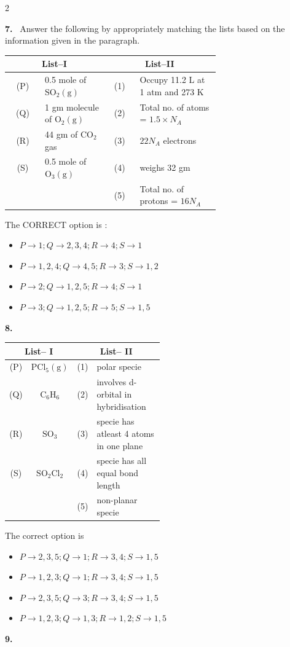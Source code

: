 \documentclass[10pt]{extarticle}
\newcommand{\qn}[1]{\par\smallskip\noindent\textbf{#1.}~}
\newenvironment{qoptions}{\begin{itemize}[leftmargin=1.8em,itemsep=1pt,topsep=2pt,label={}]}{\end{itemize}}
\newcommand{\opt}[2]{\item[(#1)] #2}
\begin{document}
\begin{multicols}{2}
\qn{7} Answer the following by appropriately matching the lists based on the information given in the paragraph.\par
{\small\setlength{\tabcolsep}{2pt}\begin{tabular}{|c|p{0.3\linewidth}|c|p{0.38\linewidth}|}
\hline
\multicolumn{2}{|c|}{\textbf{List--I}} & \multicolumn{2}{c|}{\textbf{List--II}}\\ \hline
(P) & 0.5 mole of $\mathrm{SO_2(g)}$ & (1) & Occupy 11.2 L at 1 atm and 273 K\\ \hline
(Q) & 1 gm molecule of $\mathrm{O_2(g)}$ & (2) & Total no. of atoms = $1.5\times N_A$\\ \hline
(R) & 44 gm of $\mathrm{CO_2}$ gas & (3) & $22N_A$ electrons\\ \hline
(S) & 0.5 mole of $\mathrm{O_3(g)}$ & (4) & weighs 32 gm\\ \hline
 & & (5) & Total no. of protons = $16N_A$\\ \hline
\end{tabular}}\par
The CORRECT option is :
\begin{qoptions}
\opt{A}{$P\to1;Q\to2,3,4;R\to4;S\to1$}
\opt{B}{$P\to1,2,4;Q\to4,5;R\to3;S\to1,2$}
\opt{C}{$P\to2;Q\to1,2,5;R\to4;S\to1$}
\opt{D}{$P\to3;Q\to1,2,5;R\to5;S\to1,5$}
\end{qoptions}
\qn{8}
{\small\setlength{\tabcolsep}{2pt}\begin{tabular}{|c|c|c|p{0.5\linewidth}|}
\hline
\multicolumn{2}{|c|}{\textbf{List-- I}} & \multicolumn{2}{c|}{\textbf{List-- II}}\\ \hline
(P) & $\mathrm{PCl_5(g)}$ & (1) & polar specie\\ \hline
(Q) & $\mathrm{C_6H_6}$ & (2) & involves d-orbital in hybridisation\\ \hline
(R) & $\mathrm{SO_3}$ & (3) & specie has atleast 4 atoms in one plane\\ \hline
(S) & $\mathrm{SO_2Cl_2}$ & (4) & specie has all equal bond length\\ \hline
 & & (5) & non-planar specie\\ \hline
\end{tabular}}\par
The correct option is
\begin{qoptions}
\opt{A}{$P\to2,3,5;Q\to1;R\to3,4;S\to1,5$}
\opt{B}{$P\to1,2,3;Q\to1;R\to3,4;S\to1,5$}
\opt{C}{$P\to2,3,5;Q\to3;R\to3,4;S\to1,5$}
\opt{D}{$P\to1,2,3;Q\to1,3;R\to1,2;S\to1,5$}
\end{qoptions}
\qn{9}
{\small\setlength{\tabcolsep}{2pt}\begin{tabular}{|c|c|c|p{0.38\linewidth}|}

\end{tabular}}
\end{multicols}
\end{document}
